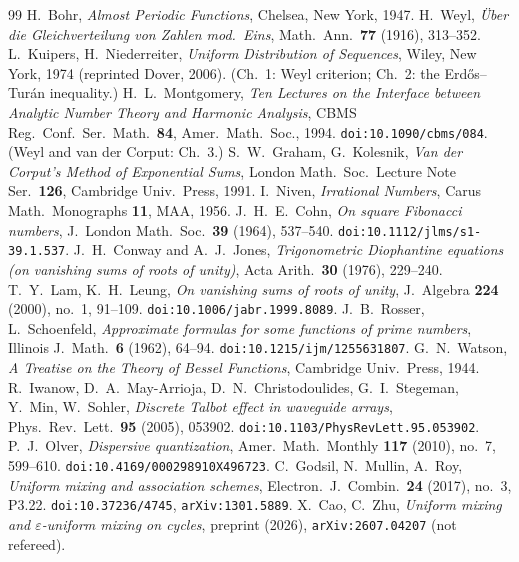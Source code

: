 \documentclass[11pt,reqno]{amsart}
\theoremstyle{plain}
\theoremstyle{definition}
\begin{document}
\begin{thebibliography}{99}
 H.~Bohr, \emph{Almost Periodic Functions}, Chelsea, New York, 1947.
 H.~Weyl, \emph{\"Uber die Gleichverteilung von Zahlen mod.\ Eins}, Math.\ Ann.\ \textbf{77} (1916), 313--352.
 L.~Kuipers, H.~Niederreiter, \emph{Uniform Distribution of Sequences}, Wiley, New York, 1974 (reprinted Dover, 2006). (Ch.~1: Weyl criterion; Ch.~2: the Erd\H{o}s--Tur\'an inequality.)
 H.~L.~Montgomery, \emph{Ten Lectures on the Interface between Analytic Number Theory and Harmonic Analysis}, CBMS Reg.\ Conf.\ Ser.\ Math.\ \textbf{84}, Amer.\ Math.\ Soc., 1994. \texttt{doi:10.1090/cbms/084}. (Weyl and van der Corput: Ch.~3.)
 S.~W.~Graham, G.~Kolesnik, \emph{Van der Corput's Method of Exponential Sums}, London Math.\ Soc.\ Lecture Note Ser.\ \textbf{126}, Cambridge Univ.\ Press, 1991.
 I.~Niven, \emph{Irrational Numbers}, Carus Math.\ Monographs \textbf{11}, MAA, 1956.
 J.~H.~E.~Cohn, \emph{On square Fibonacci numbers}, J.\ London Math.\ Soc.\ \textbf{39} (1964), 537--540. \texttt{doi:10.1112/jlms/s1-39.1.537}.
 J.~H.~Conway and A.~J.~Jones, \emph{Trigonometric Diophantine equations (on vanishing sums of roots of unity)}, Acta Arith.\ \textbf{30} (1976), 229--240.
 T.~Y.~Lam, K.~H.~Leung, \emph{On vanishing sums of roots of unity}, J.\ Algebra \textbf{224} (2000), no.~1, 91--109. \texttt{doi:10.1006/jabr.1999.8089}.
 J.~B.~Rosser, L.~Schoenfeld, \emph{Approximate formulas for some functions of prime numbers}, Illinois J.\ Math.\ \textbf{6} (1962), 64--94. \texttt{doi:10.1215/ijm/1255631807}.
 G.~N.~Watson, \emph{A Treatise on the Theory of Bessel Functions}, Cambridge Univ.\ Press, 1944.
 R.~Iwanow, D.~A.~May-Arrioja, D.~N.~Christodoulides, G.~I.~Stegeman, Y.~Min, W.~Sohler, \emph{Discrete Talbot effect in waveguide arrays}, Phys.\ Rev.\ Lett.\ \textbf{95} (2005), 053902. \texttt{doi:10.1103/PhysRevLett.95.053902}.
 P.~J.~Olver, \emph{Dispersive quantization}, Amer.\ Math.\ Monthly \textbf{117} (2010), no.~7, 599--610. \texttt{doi:10.4169/000298910X496723}.
 C.~Godsil, N.~Mullin, A.~Roy, \emph{Uniform mixing and association schemes}, Electron.\ J.\ Combin.\ \textbf{24} (2017), no.~3, P3.22. \texttt{doi:10.37236/4745}, \texttt{arXiv:1301.5889}.
 X.~Cao, C.~Zhu, \emph{Uniform mixing and $\varepsilon$-uniform mixing on cycles}, preprint (2026), \texttt{arXiv:2607.04207} (not refereed).

\end{thebibliography}
\end{document}
